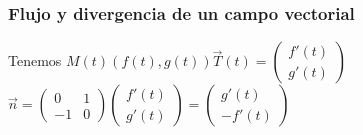 \documentclass{report}
\begin{document}
      \subsubsection*{Flujo y divergencia de un campo vectorial}
      \vspace{0.2cm}
        \begin{figure}
          \vspace{-1.6cm}
          \centering
        \end{figure}

        \vspace{0.6cm}
        \noindent Tenemos $M(t)\left(f(t),g(t)\right)$\hspace{1cm}$\vec{T}(t)=\begin{pmatrix} f'(t) \\ g'(t) \end{pmatrix}$
        $\vec{n}=\begin{pmatrix} 0 & 1\\ -1 & 0 \end{pmatrix}\begin{pmatrix} f'(t) \\ g'(t) \end{pmatrix}=
        \begin{pmatrix} g'(t) \\ -f'(t) \end{pmatrix}$
        \vspace{1cm}
        
\end{document}
